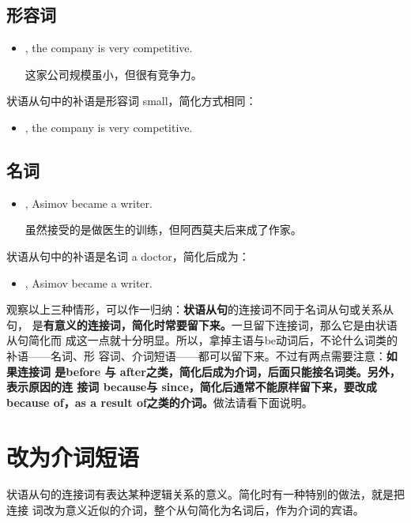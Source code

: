 \subsection{形容词}

\begin{itemize}
\item {}, the company is very competitive.

  这家公司规模虽小，但很有竞争力。
\end{itemize}
状语从句中的补语是形容词 small，简化方式相同：
\begin{itemize}
\item {}, the company is very competitive.
\end{itemize}

\subsection{名词}

\begin{itemize}
\item {}, Asimov became a writer.

  虽然接受的是做医生的训练，但阿西莫夫后来成了作家。
\end{itemize}
状语从句中的补语是名词 a doctor，简化后成为：
\begin{itemize}
\item {}, Asimov became a writer.
\end{itemize}
观察以上三种情形，可以作一归纳：\textbf{状语从句}的连接词不同于名词从句或关系从句，
是\textbf{有意义的连接词，简化时常要留下来。}一旦留下连接词，那么它是由状语从句简化而
成这一点就十分明显。所以，拿掉主语与be动词后，不论什么词类的补语——名词、形
容词、介词短语——都可以留下来。不过有两点需要注意：\textbf{如果连接词
是before 与 after之类，简化后成为介词，后面只能接名词类。另外，表示原因的连
接词 because与 since，简化后通常不能原样留下来，要改成 because of，as a
result of之类的介词。}做法请看下面说明。

\section{改为介词短语}

状语从句的连接词有表达某种逻辑关系的意义。简化时有一种特别的做法，就是把连接
词改为意义近似的介词，整个从句简化为名词后，作为介词的宾语。

